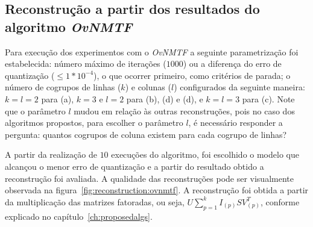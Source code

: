 \documentclass[
    12pt,                %
    oneside,            %
    a4paper,            %
    english,            %
    brazil                %
    ]{abntex2ppgsi}
\begin{document}
\subsection{Reconstrução a partir dos resultados do algoritmo \textit{OvNMTF}}
\label{subsec:results-reconstruction-ovnmtf}

Para execução dos experimentos com o \textit{OvNMTF} a seguinte parametrização foi estabelecida: número máximo de iterações ($1000$) ou a diferença do erro de quantização ($\leq 1*10^{-4}$), o que ocorrer primeiro, como critérios de parada; o número de cogrupos de linhas ($k$) e colunas ($l$) configurados da seguinte maneira: $k = l = 2$ para (a), $k = 3$ e $l = 2 $ para (b), (d) e (d), e $k = l = 3$ para (c).
Note que o parâmetro $l$ mudou em relação às outras reconstruções, pois no caso dos algoritmos propostos, para escolher o parâmetro $l$, é necessário responder a pergunta: quantos cogrupos de coluna existem para cada cogrupo de linhas?

A partir da realização de $10$ execuções do algoritmo, foi escolhido o modelo que alcançou o menor erro de quantização e a partir do resultado obtido a reconstrução foi avaliada.
A qualidade das reconstruções pode ser visualmente observada na figura~\ref{fig:reconstruction:ovnmtf}.
A reconstrução foi obtida a partir da multiplicação das matrizes fatoradas, ou seja, $U \sum_{p=1}^{k} I_{(p)} S V_{(p)}^T$, conforme explicado no capítulo~\ref{ch:proposedalgs}.
\end{document}
